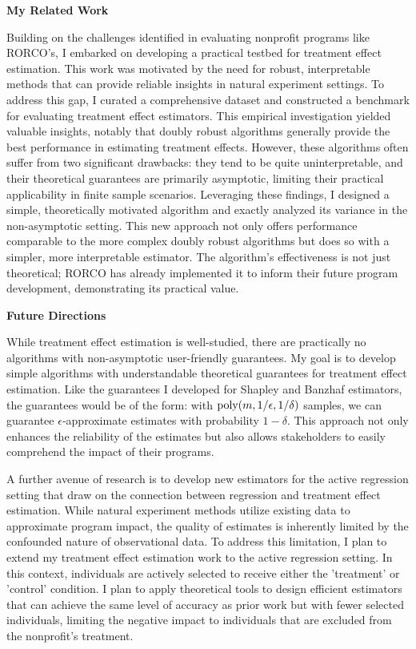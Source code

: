 \documentclass[11pt]{article}
\begin{document}
{{ \large \textbf{My Related Work}}

Building on the challenges identified in evaluating nonprofit programs like RORCO's, I embarked on developing a practical testbed for treatment effect estimation. This work was motivated by the need for robust, interpretable methods that can provide reliable insights in natural experiment settings.
To address this gap, I curated a comprehensive dataset and constructed a benchmark for evaluating treatment effect estimators. This empirical investigation yielded valuable insights, notably that doubly robust algorithms generally provide the best performance in estimating treatment effects. However, these algorithms often suffer from two significant drawbacks: they tend to be quite uninterpretable, and their theoretical guarantees are primarily asymptotic, limiting their practical applicability in finite sample scenarios.
Leveraging these findings, I designed a simple, theoretically motivated algorithm and exactly analyzed its variance in the non-asymptotic setting. This new approach not only offers performance comparable to the more complex doubly robust algorithms but does so with a simpler, more interpretable estimator. The algorithm's effectiveness is not just theoretical; RORCO has already implemented it to inform their future program development, demonstrating its practical value.

{ \large \textbf{Future Directions}}

While treatment effect estimation is well-studied, there are practically no algorithms with non-asymptotic user-friendly guarantees.
My goal is to develop simple algorithms with understandable theoretical guarantees for treatment effect estimation.
Like the guarantees I developed for Shapley and Banzhaf estimators, the guarantees would be of the form: with $\textnormal{poly}(m, 1/\epsilon, 1/\delta)$ samples, we can guarantee $\epsilon$-approximate estimates with probability $1-\delta$.
This approach not only enhances the reliability of the estimates but also allows stakeholders to easily comprehend the impact of their programs.

A further avenue of research is to develop new estimators for the active regression setting that draw on the connection between regression and treatment effect estimation.
While natural experiment methods utilize existing data to approximate program impact, the quality of estimates is inherently limited by the confounded nature of observational data. To address this limitation, I plan to extend my treatment effect estimation work to the active regression setting. In this context, individuals are actively selected to receive either the 'treatment' or 'control' condition.
I plan to apply theoretical tools to design efficient estimators that can achieve the same level of accuracy as prior work but with fewer selected individuals, limiting the negative impact to individuals that are excluded from the nonprofit’s treatment.

}
\end{document}
